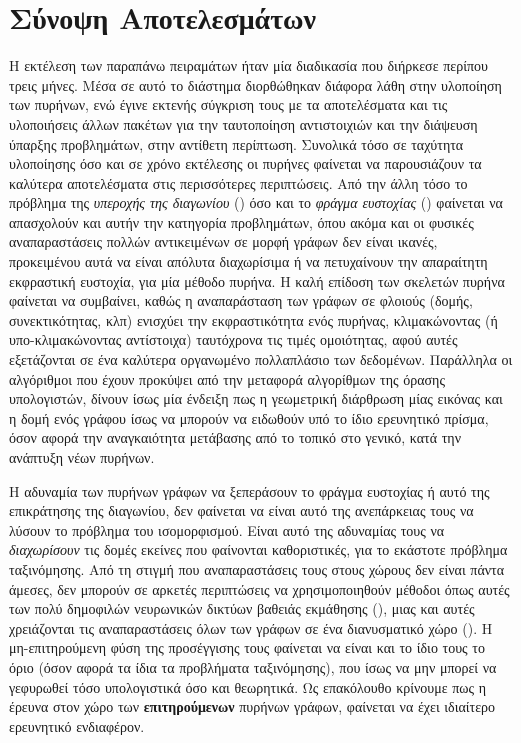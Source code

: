 \section{Σύνοψη Αποτελεσμάτων}
Η εκτέλεση των παραπάνω πειραμάτων ήταν μία διαδικασία που διήρκεσε περίπου τρεις μήνες.
Μέσα σε αυτό το διάστημα διορθώθηκαν διάφορα λάθη στην υλοποίηση των πυρήνων, ενώ έγινε εκτενής σύγκριση τους με τα αποτελέσματα και τις υλοποιήσεις άλλων πακέτων για την ταυτοποίηση αντιστοιχιών και την διάψευση ύπαρξης προβλημάτων, στην αντίθετη περίπτωση.
Συνολικά τόσο σε ταχύτητα υλοποίησης όσο και σε χρόνο εκτέλεσης οι πυρήνες  φαίνεται να παρουσιάζουν τα καλύτερα αποτελέσματα στις περισσότερες περιπτώσεις.
Από την άλλη τόσο το πρόβλημα της \textit{υπεροχής της διαγωνίου} () όσο και το \textit{φράγμα ευστοχίας} () φαίνεται να απασχολούν και αυτήν την κατηγορία προβλημάτων, όπου ακόμα και οι φυσικές αναπαραστάσεις πολλών αντικειμένων σε μορφή γράφων δεν είναι ικανές, προκειμένου αυτά να είναι απόλυτα διαχωρίσιμα ή να πετυχαίνουν την απαραίτητη εκφραστική ευστοχία, για μία μέθοδο πυρήνα.
Η καλή επίδοση των σκελετών πυρήνα φαίνεται να συμβαίνει, καθώς η αναπαράσταση των γράφων σε φλοιούς (δομής, συνεκτικότητας, κλπ) ενισχύει την εκφραστικότητα ενός πυρήνας, κλιμακώνοντας (ή υπο-κλιμακώνοντας αντίστοιχα) ταυτόχρονα τις τιμές ομοιότητας, αφού αυτές εξετάζονται σε ένα καλύτερα οργανωμένο πολλαπλάσιο των δεδομένων.
Παράλληλα οι αλγόριθμοι  που έχουν προκύψει από την μεταφορά αλγορίθμων της όρασης υπολογιστών, δίνουν ίσως μία ένδειξη πως η γεωμετρική διάρθρωση μίας εικόνας και η δομή ενός γράφου ίσως να μπορούν να ειδωθούν υπό το ίδιο ερευνητικό πρίσμα, όσον αφορά την αναγκαιότητα μετάβασης από το τοπικό στο γενικό, κατά την ανάπτυξη νέων πυρήνων.\par
Η αδυναμία των πυρήνων γράφων να ξεπεράσουν το φράγμα ευστοχίας ή αυτό της επικράτησης της διαγωνίου, δεν φαίνεται να είναι αυτό της ανεπάρκειας τους να λύσουν το πρόβλημα του ισομορφισμού.
Είναι αυτό της αδυναμίας τους να \textit{διαχωρίσουν} τις δομές εκείνες που φαίνονται καθοριστικές, για το εκάστοτε πρόβλημα ταξινόμησης.
Από τη στιγμή που αναπαραστάσεις τους στους χώρους  δεν είναι πάντα άμεσες, δεν μπορούν σε αρκετές περιπτώσεις  να χρησιμοποιηθούν μέθοδοι όπως αυτές των πολύ δημοφιλών νευρωνικών δικτύων βαθειάς εκμάθησης (), μιας και αυτές χρειάζονται τις αναπαραστάσεις όλων των γράφων σε ένα διανυσματικό χώρο ().
Η μη-επιτηρούμενη φύση της προσέγγισης τους φαίνεται να είναι και το ίδιο τους το όριο (όσον αφορά τα ίδια τα προβλήματα ταξινόμησης), που ίσως να μην μπορεί να γεφυρωθεί τόσο υπολογιστικά όσο και θεωρητικά.
Ως επακόλουθο κρίνουμε πως η έρευνα στον χώρο των \textbf{επιτηρούμενων} πυρήνων γράφων, φαίνεται να έχει ιδιαίτερο ερευνητικό ενδιαφέρον.
